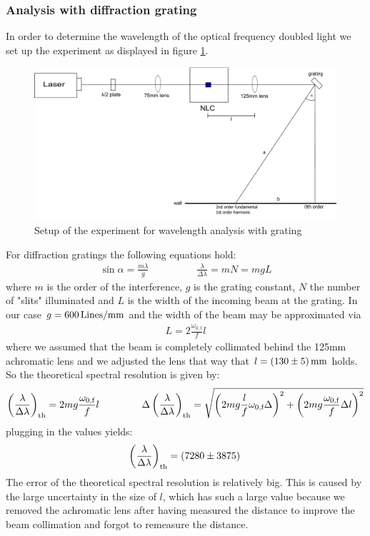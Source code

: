 \documentclass{protokoll_en}
\begin{document}
\subsubsection{Analysis with diffraction grating}\label{subsubsec:ana_grating}
In order to determine the wavelength of the optical frequency doubled light we set up the experiment as displayed in figure \ref{fig:setup_grating}.
\begin{figure}[H]
  \centering
  \includegraphics[width=1.0\textwidth]{graphics/setup_grating}
  \caption{Setup of the experiment for wavelength analysis with grating}
  \label{fig:setup_grating}
\end{figure}
For diffraction gratings the following equations hold:
\begin{align*}
\sin \alpha = \frac{m\lambda}{g} \hspace{2cm} \frac{\lambda}{\Delta \lambda} = mN = mg L
\end{align*}
where $m$ is the order of the interference, $g$ is the grating constant, $N$ the number of "slits" illuminated and $L$ is the width of the incoming beam at the grating. In our case $g = \unit[600]{Lines/mm}$ and the width of the beam may be approximated via
\begin{align*}
L = 2\frac{\omega_{0,\textrm{f}}}{f}l
\end{align*}
where we assumed that the beam is completely collimated behind the 125mm achromatic lens and we adjusted the lens that way that $l = \unit[(130 \pm 5)]{mm}$ holds. So the theoretical spectral resolution is given by:
\begin{align}
\left(\frac{\lambda}{\Delta\lambda}\right)_\textrm{th} = 2mg\frac{\omega_{0,\textrm{f}}}{f}l \hspace{1.5cm} \Delta\left(\frac{\lambda}{\Delta\lambda}\right)_\textrm{th} = \sqrt{\left(2mg\frac{l}{f}\omega_{0,\textrm{f}}\Delta \right)^2+\left(2mg\frac{\omega_{0,\textrm{f}}}{f}\Delta l\right)^2}
\end{align}
plugging in the values yields:
\begin{align}
\left(\frac{\lambda}{\Delta\lambda}\right)_\textrm{th} = \unit[(7280 \pm 3875)]{}
\end{align}
The error of the theoretical spectral resolution is relatively big. This is caused by the large uncertainty in the size of $l$, which has such a large value because we removed the achromatic lens after having measured the distance to improve the beam collimation and forgot to remeasure the distance.
\end{document}
